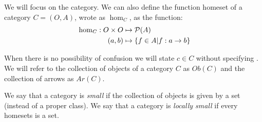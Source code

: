 We will focus on the category. We can also define the function homeset of a category $C=(O,A)$, wrote as $\hom_{C}$, as the function:
\begin{align*}
  && \hom_{C}: O \times O &\mapsto \mathcal{P}(A)&\\
  \displaystyle &\ &(a,b)&\mapsto \{f\in A | f:a\to b\}&
\end{align*}

When there is no possibility of confusion we will state $c\in C$ without specifying . We will refer to the collection of objects of a category $C$ as $Ob(C)$ and the collection of arrows as $Ar(C)$. 

\begin{definition}
  We say that a category is \emph{small} if the collection of objects is given by a set (instead of a proper class). We say that a category is \emph{locally small} if every homesets is a set.
\end{definition}

